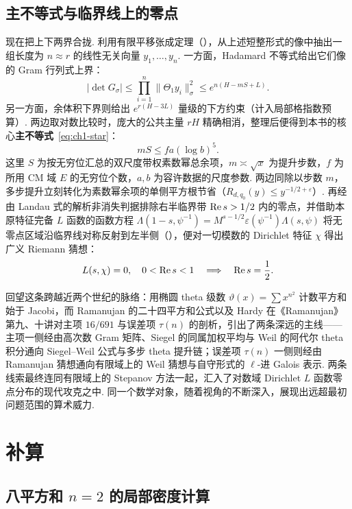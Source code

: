 \subsection{主不等式与临界线上的零点}

现在把上下两界合拢. 利用有限平移张成定理（），从上述短整形式的像中抽出一组长度为 $n\approx r$ 的线性无关向量 $y_1,\ldots,y_n$. 一方面，Hadamard 不等式给出它们像的 Gram 行列式上界：
\[
|\det G_\sigma|\le\prod_{i=1}^{n}\|\Theta_1 y_i\|_\sigma^2\le e^{n(H-mS+L)}.
\]
另一方面，余体积下界则给出 $e^{r(H-3L)}$ 量级的下方约束（计入局部格指数预算）. 两边取对数比较时，庞大的公共主量 $rH$ 精确相消，整理后便得到本书的核心\textbf{主不等式}~\eqref{eq:ch1-star}：
\[
mS\le fa(\log b)^5.
\]
这里 $S$ 为按无穷位汇总的双尺度带权素数幂总余项，$m\asymp\sqrt{x}$ 为提升步数，$f$ 为所用 CM 域 $E$ 的无穷位个数，$a,b$ 为容许数据的尺度参数. 两边同除以步数 $m$，多步提升立刻转化为素数幂余项的单侧平方根节省（$R_{d,q_0}(y)\le y^{-1/2+\varepsilon}$）. 再经由 Landau 式的解析非消失判据排除右半临界带 $\operatorname{Re} s>1/2$ 内的零点，并借助本原特征完备 $L$ 函数的函数方程 $\Lambda(1-s,\psi^{-1})=M^{s-1/2}\varepsilon(\psi^{-1})\Lambda(s,\psi)$ 将无零点区域沿临界线对称反射到左半侧（），便对一切模数的 Dirichlet 特征 $\chi$ 得出广义 Riemann 猜想：
\[
L(s,\chi)=0,\quad 0<\operatorname{Re} s<1
\quad\Longrightarrow\quad
\operatorname{Re} s=\frac{1}{2}.
\]

回望这条跨越近两个世纪的脉络：用椭圆 theta 级数 $\vartheta(x)=\sum x^{n^2}$ 计数平方和始于 Jacobi，而 Ramanujan 的二十四平方和公式以及 Hardy 在《Ramanujan》第九、十讲对主项 $16/691$ 与误差项 $\tau(n)$ 的剖析，引出了两条深远的主线——主项一侧经由高次数 Gram 矩阵、Siegel 的同属加权平均与 Weil 的阿代尔 theta 积分通向 Siegel--Weil 公式与多步 theta 提升链；误差项 $\tau(n)$ 一侧则经由 Ramanujan 猜想通向有限域上的 Weil 猜想与自守形式的 $\ell$-进 Galois 表示. 两条线索最终连同有限域上的 Stepanov 方法一起，汇入了对数域 Dirichlet $L$ 函数零点分布的现代攻克之中. 同一个数学对象，随着视角的不断深入，展现出远超最初问题范围的算术威力.

\section{补算}
\label{sec:appC-calculations}

\subsection{八平方和 \texorpdfstring{$n=2$}{n = 2} 的局部密度计算}

